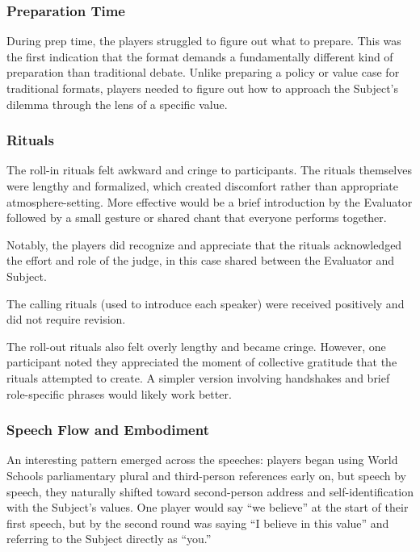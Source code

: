 \documentclass[12pt]{article}
\begin{document}
\subsubsection{Preparation Time}

During prep time, the players struggled to figure out what to prepare. This was the first indication that the format demands a fundamentally different kind of preparation than traditional debate. Unlike preparing a policy or value case for traditional formats, players needed to figure out how to approach the Subject's dilemma through the lens of a specific value.

\subsubsection{Rituals}

The roll-in rituals felt awkward and cringe to participants. The rituals themselves were lengthy and formalized, which created discomfort rather than appropriate atmosphere-setting. More effective would be a brief introduction by the Evaluator followed by a small gesture or shared chant that everyone performs together.

Notably, the players did recognize and appreciate that the rituals acknowledged the effort and role of the judge, in this case shared between the Evaluator and Subject.

The calling rituals (used to introduce each speaker) were received positively and did not require revision.

The roll-out rituals also felt overly lengthy and became cringe. However, one participant noted they appreciated the moment of collective gratitude that the rituals attempted to create. A simpler version involving handshakes and brief role-specific phrases would likely work better.

\subsubsection{Speech Flow and Embodiment}

An interesting pattern emerged across the speeches: players began using World Schools parliamentary plural and third-person references early on, but speech by speech, they naturally shifted toward second-person address and self-identification with the Subject's values. One player would say ``we believe'' at the start of their first speech, but by the second round was saying ``I believe in this value'' and referring to the Subject directly as ``you.''
\end{document}
